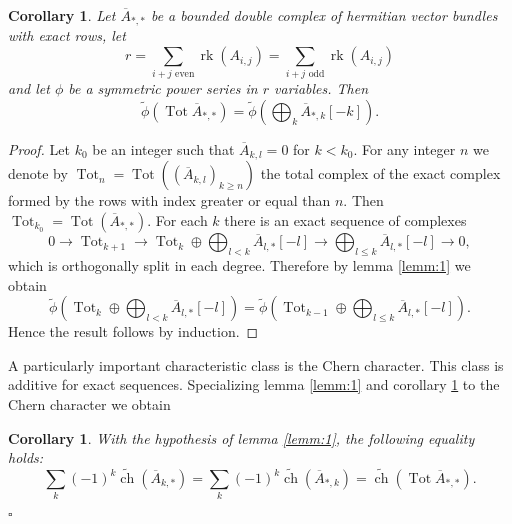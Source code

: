 \documentclass[10pt,twoside]{article}
\numberwithin{equation}{section}
\theoremstyle{plain}
\newtheorem{corollary}[equation]{Corollary}
\theoremstyle{definition}
\DeclareMathOperator{\Tot}{Tot}
\DeclareMathOperator{\ch}{ch}
\DeclareMathOperator{\rk}{rk}
\begin{document}
\begin{corollary}\label{cor:12}
  Let $\overline A_{\ast,\ast}$ be a bounded double complex of
  hermitian vector bundles with exact rows, let
  $$r=\sum_{i+j \text{ even} }\rk(A_{i,j})=\sum_{i+j \text{ odd}
  }\rk(A_{i,j})
  $$
  and
  let $\phi $ be a symmetric power series in $r$ variables. Then
  \begin{displaymath}
        \widetilde {\phi }(\Tot \overline A_{\ast,\ast})
        =\widetilde
        {\phi}(\bigoplus_{k}\overline A_{\ast,k}[-k]).
  \end{displaymath}
\end{corollary}
\begin{proof}
  Let $k_{0}$ be an integer such that $\overline A_{k,l}=0$ for
  $k<k_{0}$. For 
  any integer $n$ we denote by $\Tot_{n}=\Tot((\overline
  A_{k,l})_{k\ge n})$ the 
  total complex of the exact complex formed by the rows with index
  greater or equal than $n$. Then
  $\Tot_{k_{0}}=\Tot(\overline A_{\ast,\ast})$. For each $k$ there is
  an exact 
  sequence of complexes 
  \begin{displaymath}
    0\longrightarrow 
    \Tot_{k+1}\longrightarrow \Tot_{k}\oplus \bigoplus_{l<k}
    \overline {A}_{l,\ast}[-l]\longrightarrow 
    \bigoplus_{l\le k}
    \overline {A}_{l,\ast}[-l]\longrightarrow 0,
  \end{displaymath}
  which is orthogonally split in each degree. Therefore by lemma
  \ref{lemm:1} we obtain
  \begin{displaymath}
        \widetilde {\phi }(\Tot_{k} \oplus \bigoplus_{l<k}
    \overline {A}_{l,\ast}[-l])
        =\widetilde {\phi }(\Tot_{k-1} \oplus \bigoplus_{l\le k}
    \overline {A}_{l,\ast}[-l]).    
  \end{displaymath}
  Hence the result follows by induction.
\end{proof}


A particularly important characteristic class is the Chern
character. This class is additive for exact sequences. Specializing
lemma 
\ref{lemm:1} and corollary \ref{cor:12} to the Chern character we
obtain 

\begin{corollary} \label{cor:9} With the hypothesis of lemma
  \ref{lemm:1}, the following equality holds: 
  \begin{displaymath}
    \sum_{k}(-1)^{k}\widetilde{\ch}(\overline A_{k,\ast})=        
    \sum_{k}(-1)^{k}\widetilde{\ch}(\overline A_{\ast,k})=
    \widetilde{\ch}(\Tot \overline A_{\ast,\ast}).
  \end{displaymath}
\end{corollary}
\hfill $\square$
\end{document}
